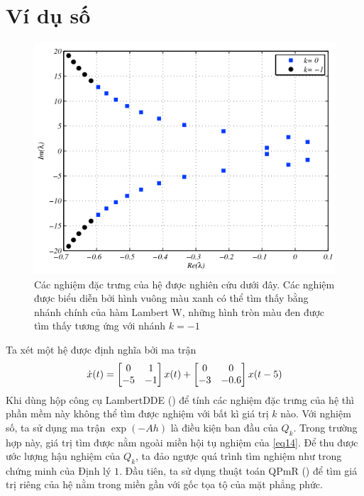 \section{Ví dụ số}
\begin{figure}[h!]
	\centering
	\includegraphics[scale= 0.7]{"./Hinh/Hinh 2"}
	\caption[Các nghiệm đặc trưng của hệ được nghiên cứu dưới đây. Các nghiệm được biểu diễn bởi hình vuông màu xanh có thể tìm thấy bằng nhánh chính của hàm Lambert W, những hình tròn màu đen được tìm thấy tương ứng với nhánh $k = -1$ ] {Các nghiệm đặc trưng của hệ được nghiên cứu dưới đây. Các nghiệm được biểu diễn bởi hình vuông màu xanh có thể tìm thấy bằng nhánh chính của hàm Lambert W, những hình tròn màu đen được tìm thấy tương ứng với nhánh $k = -1$}
	\label{fig:hinh-2}
\end{figure}
%
\noindent Ta xét một hệ được định nghĩa bởi ma trận
\begin{equation}\label{eq33}
	\dot{x}(t) = \begin{bmatrix} 0 & 1\\ -5 &-1 \end{bmatrix}x(t) + \begin{bmatrix} 	0 & 0\\ -3 &-0.6 \end{bmatrix}x(t - 5)
\end{equation}
Khi dùng hộp công cụ LambertDDE (\cite{YiJune12}) để tính các nghiệm đặc trưng của hệ thì phần mềm này không thể tìm được nghiệm với bất kì giá trị $k$ nào. Với nghiệm số, ta sử dụng ma trận $\exp (-Ah )$ là điều kiện ban đầu của $Q_k$. Trong trường hợp này, giá trị tìm được nằm ngoài miền hội tụ nghiệm của \eqref{eq14}.
Để thu được ước lượng hậu nghiệm của $Q_k$, ta đảo ngược quá trình tìm nghiệm như trong chứng minh của Định lý $1$. 
Đầu tiên, ta sử dụng thuật toán QPmR (\cite{Vyh09}) để tìm giá trị riêng của hệ nằm trong miền gần với gốc tọa tộ của mặt phẳng phức. 
